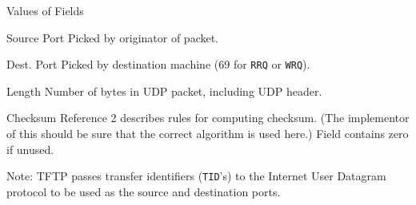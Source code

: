 \documentclass[12pt]{article}
\begin{document}
  
   Values of Fields
  
  
   Source Port   Picked by originator of packet.
  
   Dest. Port   Picked by destination machine (69 for \verb|RRQ| or \verb|WRQ|).
  
   Length     Number of bytes in UDP packet, including UDP header.
  
   Checksum    Reference 2 describes rules for computing checksum.
           (The implementor of this should be sure that the
           correct algorithm is used here.)
           Field contains zero if unused.
  
   Note: TFTP passes transfer identifiers (\verb|TID|'s) to the Internet User
   Datagram protocol to be used as the source and destination ports.
\end{document}
